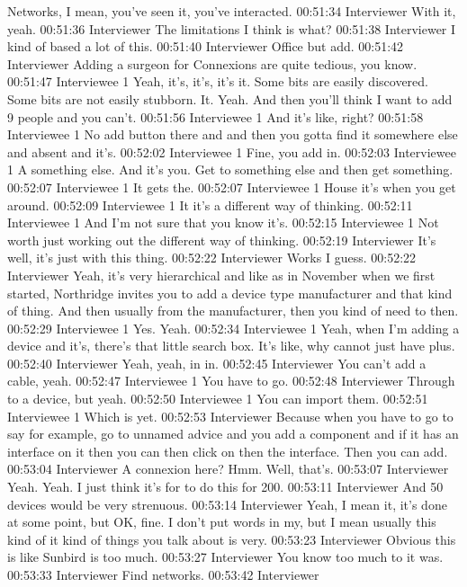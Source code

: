 Networks, I mean, you've seen it, you've interacted.
00:51:34 Interviewer
With it, yeah.
00:51:36 Interviewer
The limitations I think is what?
00:51:38 Interviewer
I kind of based a lot of this.
00:51:40 Interviewer
Office but add.
00:51:42 Interviewer
Adding a surgeon for Connexions are quite tedious, you know.
00:51:47 Interviewee 1
Yeah, it's, it's, it's it. Some bits are easily discovered. Some bits are not easily stubborn. It. Yeah. And then you'll think I want to add 9 people and you can't.
00:51:56 Interviewee 1
And it's like, right?
00:51:58 Interviewee 1
No add button there and and then you gotta find it somewhere else and absent and it's.
00:52:02 Interviewee 1
Fine, you add in.
00:52:03 Interviewee 1
A something else. And it's you. Get to something else and then get something.
00:52:07 Interviewee 1
It gets the.
00:52:07 Interviewee 1
House it's when you get around.
00:52:09 Interviewee 1
It it's a different way of thinking.
00:52:11 Interviewee 1
And I'm not sure that you know it's.
00:52:15 Interviewee 1
Not worth just working out the different way of thinking.
00:52:19 Interviewer
It's well, it's just with this thing.
00:52:22 Interviewer
Works I guess.
00:52:22 Interviewer
Yeah, it's very hierarchical and like as in November when we first started, Northridge invites you to add a device type manufacturer and that kind of thing. And then usually from the manufacturer, then you kind of need to then.
00:52:29 Interviewee 1
Yes. Yeah.
00:52:34 Interviewee 1
Yeah, when I'm adding a device and it's, there's that little search box. It's like, why cannot just have plus.
00:52:40 Interviewer
Yeah, yeah, in in.
00:52:45 Interviewer
You can't add a cable, yeah.
00:52:47 Interviewee 1
You have to go.
00:52:48 Interviewer
Through to a device, but yeah.
00:52:50 Interviewee 1
You can import them.
00:52:51 Interviewee 1
Which is yet.
00:52:53 Interviewer
Because when you have to go to say for example, go to unnamed advice and you add a component and if it has an interface on it then you can then click on then the interface. Then you can add.
00:53:04 Interviewer
A connexion here? Hmm. Well, that's.
00:53:07 Interviewer
Yeah. Yeah. I just think it's for to do this for 200.
00:53:11 Interviewer
And 50 devices would be very strenuous.
00:53:14 Interviewer
Yeah, I mean it, it's done at some point, but OK, fine. I don't put words in my, but I mean usually this kind of it kind of things you talk about is very.
00:53:23 Interviewer
Obvious this is like Sunbird is too much.
00:53:27 Interviewer
You know too much to it was.
00:53:33 Interviewer
Find networks.
00:53:42 Interviewer
